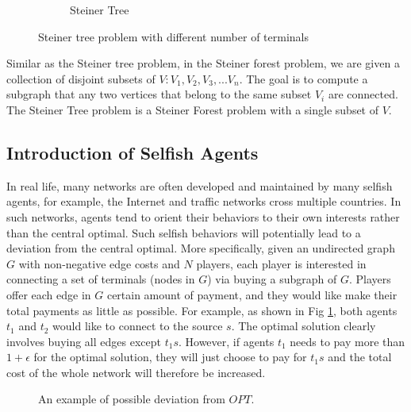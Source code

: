 \documentclass[11pt,psfig,times]{article}
\begin{document}
\begin{figure}[H]
\begin{center}
\begin{subfigure}[b]{0.25\textwidth}
			\caption{Steiner Tree}
		\end{subfigure}
		\caption{Steiner tree problem with different number of terminals}
	\end{center}
\end{figure}
Similar as the Steiner tree problem, in the Steiner forest problem, we are given a collection of disjoint subsets of \(V: V_1,V_2,V_3,...V_n\). The goal is to compute a subgraph that any two vertices that belong to the same subset \(V_i\) are connected. The Steiner Tree problem is a Steiner Forest problem with a single subset of \(V\).  

\subsection{Introduction of Selfish Agents}
In real life, many networks are often developed and maintained by many selfish agents, for example, the Internet and traffic networks cross multiple countries. In such networks, agents tend to orient their behaviors to their own interests rather than the central optimal. Such selfish behaviors will potentially lead to a deviation from the central optimal. More specifically, given an undirected graph \(G\) with non-negative edge costs and \(N\) players, each player is interested in connecting a set of terminals (nodes in \(G\)) via buying a subgraph of \(G\). Players offer each edge in \(G\) certain amount of payment, and they would like make their total payments as little as possible. For example, as shown in Fig \ref{fig:deviation}, both agents $t_1$ and $t_2$ would like to connect to the source $s$. The optimal solution clearly involves buying all edges except $t_1s$. However, if agents $t_1$ needs to pay more than $1+\epsilon$ for the optimal solution, they will just choose to pay for $t_1s$ and the total cost of the whole network will therefore be increased.

\begin{figure}[H]
	\begin{center}
	\end{center}
	\caption{An example of possible deviation from $OPT$.}
	\label{fig:deviation}
\end{figure}
\end{document}
